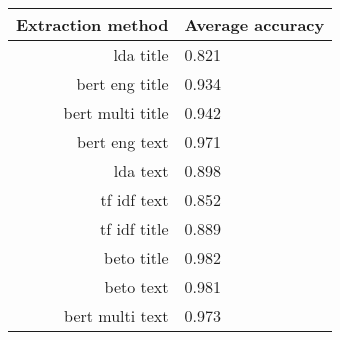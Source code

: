 \begin{tabular}{|r|l|}
  \hline
  Extraction method & Average accuracy \\ 
  \hline
  lda title & 0.821 \\ 
  \hline
  bert eng title & 0.934 \\ 
  \hline
  bert multi title & 0.942 \\ 
  \hline
  bert eng text & 0.971 \\ 
  \hline
  lda text & 0.898 \\ 
  \hline
  tf idf text & 0.852 \\ 
  \hline
  tf idf title & 0.889 \\ 
  \hline
  beto title & 0.982 \\ 
  \hline
  beto text & 0.981 \\ 
  \hline
  bert multi text & 0.973 \\ 
  \hline
\end{tabular}
